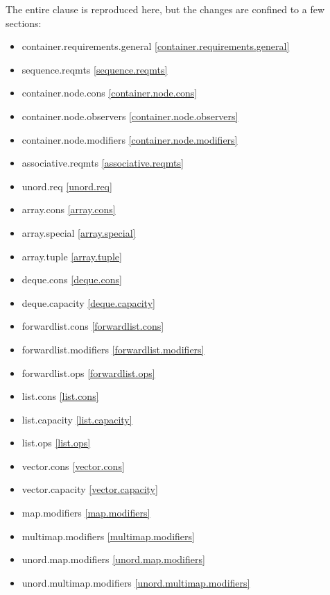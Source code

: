 \vspace{1.0cm}
The entire clause is reproduced here, but the changes are confined to a few sections:

\begin{multicols}{2}
\begin{itemize}
\item{container.requirements.general  \ref{container.requirements.general}}
\item{sequence.reqmts                 \ref{sequence.reqmts}}
\item{container.node.cons             \ref{container.node.cons}}
\item{container.node.observers        \ref{container.node.observers}}
\item{container.node.modifiers        \ref{container.node.modifiers}}
\item{associative.reqmts              \ref{associative.reqmts}}
\item{unord.req                       \ref{unord.req}}

\item{array.cons             \ref{array.cons}}
\item{array.special          \ref{array.special}}
\item{array.tuple            \ref{array.tuple}}
\item{deque.cons             \ref{deque.cons}}
\item{deque.capacity         \ref{deque.capacity}}
\item{forwardlist.cons       \ref{forwardlist.cons}}
\item{forwardlist.modifiers  \ref{forwardlist.modifiers}}
\item{forwardlist.ops        \ref{forwardlist.ops}}
\item{list.cons              \ref{list.cons}}
\item{list.capacity          \ref{list.capacity}}
\item{list.ops               \ref{list.ops}}
\item{vector.cons            \ref{vector.cons}}
\item{vector.capacity        \ref{vector.capacity}}

\item{map.modifiers            \ref{map.modifiers}}
\item{multimap.modifiers       \ref{multimap.modifiers}}
\item{unord.map.modifiers      \ref{unord.map.modifiers}}
\item{unord.multimap.modifiers \ref{unord.multimap.modifiers}}


\end{itemize}
\end{multicols}
